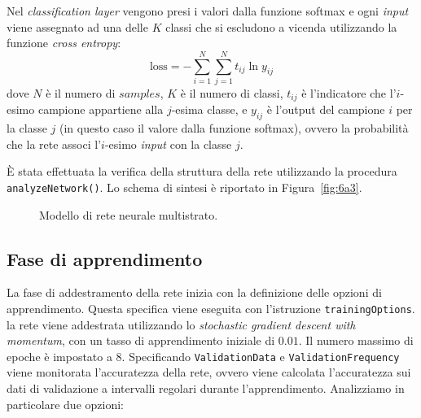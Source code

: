 \documentclass[a4paper,12pt]{article}
\begin{document}
\begin{itemize}
    Nel \emph{classification layer} vengono presi i valori dalla funzione softmax e ogni \emph{input} viene assegnato ad una delle $K$ classi che si escludono a vicenda utilizzando la funzione \emph{cross entropy}:
    \[
        \text{loss} = -\sum_{i=1}^N\sum_{j=1}^N t_{ij} \ln y_{ij}    
    \]
    dove $N$ è il numero di $samples$, $K$ è il numero di classi, $t_{ij}$ è l'indicatore che l'$i$-esimo campione appartiene alla $j$-esima classe, e $y_{ij}$ è l'output del campione $i$ per la classe $j$ (in questo caso il valore dalla funzione softmax), ovvero la probabilità che la rete associ l'$i$-esimo \emph{input} con la classe $j$.
\end{itemize}

È stata effettuata la verifica della struttura della rete utilizzando la procedura \texttt{analyzeNetwork()}. Lo schema di sintesi è riportato in Figura~\vref{fig:6a3}.

\begin{figure}[htb]
    \hspace*{-3cm}
    \caption{Modello di rete neurale multistrato.}
    \label{fig:6a3}
\end{figure}




\subsection{Fase di apprendimento}\label{sec:fase-apprendimento}
La fase di addestramento della rete inizia con la definizione delle opzioni di apprendimento. Questa specifica viene eseguita con l'istruzione \texttt{trainingOptions}. la rete viene addestrata utilizzando lo \emph{stochastic gradient descent with momentum}, con un tasso di apprendimento iniziale di $0.01$. Il numero massimo di epoche è impostato a 8. Specificando \texttt{ValidationData} e \texttt{ValidationFrequency} viene monitorata l'accuratezza della rete, ovvero viene calcolata l'accuratezza sui dati di validazione a intervalli regolari durante l'apprendimento. Analizziamo in particolare due opzioni:
\end{document}
